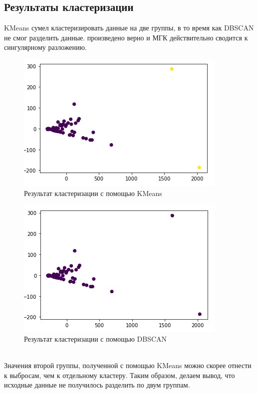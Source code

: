 \documentclass[a4]{article}
\begin{document}
	\subsection{Результаты кластеризации}
	KMeans сумел кластеризировать данные на две группы, в то время как DBSCAN не смог разделить данные.
	произведено верно и МГК действительно сводится к сингулярному разложению.
	\begin{figure}[h!]
		\includegraphics[width=\textwidth]{kmeans.png}\caption[Результат кластеризации с помощью KMeans]{Результат кластеризации с помощью KMeans}
	\end{figure}
	\begin{figure}[h!]
		\includegraphics[width=\textwidth]{dbscan.png}\caption[Результат кластеризации с помощью DBSCAN]{Результат кластеризации с помощью DBSCAN}
	\end{figure} \\
	Значения второй группы, полученной с помощью KMeans можно скорее отнести к выбросам, чем к отдельному кластеру. Таким образом, делаем вывод, что исходные данные не получилось разделить по двум группам.
	
\end{document}
